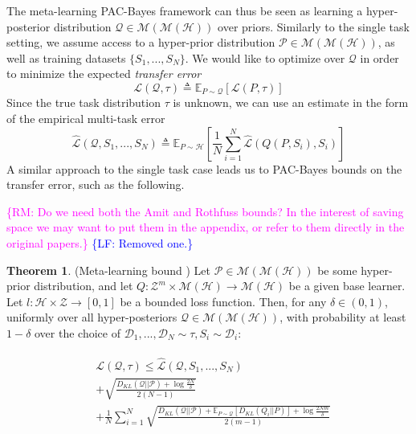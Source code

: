 \documentclass[letterpaper]{article} %
\theoremstyle{definition}
\newtheorem{theorem}{Theorem}[section]
\newcommand{\Expect}[2]{\mathbb{E}_{#1}\left [#2 \right ]}
\newcommand{\RM}[1]{\textcolor{magenta}{\{RM: #1\}}}
\newcommand{\LF}[1]{\textcolor{blue}{\{LF: #1\}}}
\begin{document}
The meta-learning PAC-Bayes framework can thus be seen as learning a hyper-posterior distribution $\mathcal{Q}\in \mathcal{M}(\mathcal{M}(\mathcal{H}))$ over priors. Similarly to the single task setting, we assume access to a hyper-prior distribution $\mathcal{P}\in \mathcal{M}(\mathcal{M}(\mathcal{H}))$, as well as training datasets $\{S_1,...,S_N\}$.
We would like to optimize over $\mathcal{Q}$ in order to minimize the expected \emph{transfer error} 
$$
\mathcal{L}(\mathcal{Q}, \tau) \triangleq \Expect{P\sim \mathcal{Q}}{\mathcal{L}(P, \tau)}
$$
Since the true task distribution $\tau$ is unknown, we can use an estimate in the form of the empirical multi-task error $$\hat{\mathcal{L}}(\mathcal{Q}, S_1,...,S_N)\triangleq \Expect{P\sim \mathcal{H}}{\frac{1}{N}\sum_{i=1}^{N}\hat{\mathcal{L}}(Q(P, S_i), S_i)}$$
A similar approach to the single task case leads us to PAC-Bayes bounds on the transfer error, such as the following.

\RM{Do we need both the Amit and Rothfuss bounds? In the interest of saving space we may want to put them in the appendix, or refer to them directly in the original papers.} \LF{Removed one.}
\begin{theorem} (Meta-learning bound \citep{Amit2018}) \label{thm:meta-pb}
	Let $\mathcal{P}\in \mathcal{M}(\mathcal{M}(\mathcal{H}))$ be some hyper-prior distribution, and let $Q: \mathcal{Z}^m\times\mathcal{M}(\mathcal{H})\rightarrow \mathcal{M}(\mathcal{H})$ be a given base learner. Let $l: \mathcal{H}\times \mathcal{Z}\rightarrow [0, 1]$ be a bounded loss function.
	Then, for any $\delta \in (0,1)$, uniformly over all hyper-posteriors $\mathcal{Q}\in \mathcal{M}(\mathcal{M}(\mathcal{H}))$, with probability at least $1-\delta$ over the choice of $\mathcal{D}_1,...,\mathcal{D}_N\sim \tau, S_i\sim \mathcal{D}_i$:
	
	\begin{align} \label{eq:meta-pb-amit}
	\begin{split}
	&\mathcal{L}(\mathcal{Q}, \tau) \leq \hat{\mathcal{L}}(\mathcal{Q}, S_1,...,S_N) \\
	&+\sqrt{\frac{D_{KL}(\mathcal{Q}||\mathcal{P})+\log\frac{2N}{\delta}}{2(N-1)}} \\
	&+\frac{1}{N}\sum_{i=1}^{N}\sqrt{\frac{D_{KL}(\mathcal{Q}||\mathcal{P})+\Expect{P\sim \mathcal{Q}}{D_{KL}(Q_i||P)}+\log\frac{2Nm}{\delta}}{2(m-1)}}
	\end{split}
	\end{align}
	
\end{theorem}
\end{document}
